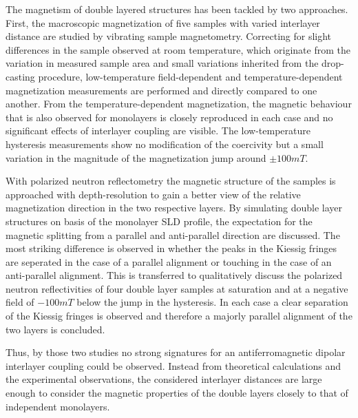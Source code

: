 \documentclass[\main/dresen_thesis.tex]{subfiles}
\begin{document}
  \label{sec:doublelayers:magnetism:summary}
  The magnetism of double layered structures has been tackled by two approaches.
  First, the macroscopic magnetization of five samples with varied interlayer distance are studied by vibrating sample magnetometry.
  Correcting for slight differences in the sample observed at room temperature, which originate from the variation in measured sample area and small variations inherited from the drop-casting procedure, low-temperature field-dependent and temperature-dependent magnetization measurements are performed and directly compared to one another.
  From the temperature-dependent magnetization, the magnetic behaviour that is also observed for monolayers is closely reproduced in each case and no significant effects of interlayer coupling are visible.
  The low-temperature hysteresis measurements show no modification of the coercivity but a small variation in the magnitude of the magnetization jump around $\pm 100 \unit{mT}$.

  With polarized neutron reflectometry the magnetic structure of the samples is approached with depth-resolution to gain a better view of the relative magnetization direction in the two respective layers.
  By simulating double layer structures on basis of the monolayer SLD profile, the expectation for the magnetic splitting from a parallel and anti-parallel direction are discussed.
  The most striking difference is observed in whether the peaks in the Kiessig fringes are seperated in the case of a parallel alignment or touching in the case of an anti-parallel alignment.
  This is transferred to qualitatively discuss the polarized neutron reflectivities of four double layer samples at saturation and at a negative field of $-100 \unit{mT}$ below the jump in the hysteresis.
  In each case a clear separation of the Kiessig fringes is observed and therefore a majorly parallel alignment of the two layers is concluded.

  Thus, by those two studies no strong signatures for an antiferromagnetic dipolar interlayer coupling could be observed.
  Instead from theoretical calculations and the experimental observations, the considered interlayer distances are large enough to consider the magnetic properties of the double layers closely to that of independent monolayers.
\end{document}
